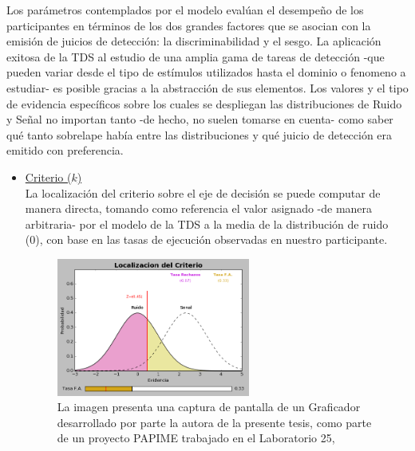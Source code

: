 Los parámetros contemplados por el modelo evalúan el desempeño de los participantes en términos de los dos grandes factores que se asocian con la emisión de juicios de detección: la discriminabilidad y el sesgo. La aplicación exitosa de la TDS al estudio de una amplia gama de tareas de detección -que pueden variar desde el tipo de estímulos utilizados hasta el dominio o fenomeno a estudiar- es posible gracias a la abstracción de sus elementos. Los valores y el tipo de evidencia específicos sobre los cuales se despliegan las distribuciones de Ruido y Señal no importan tanto -de hecho, no suelen tomarse en cuenta- como saber qué tanto sobrelape había entre las distribuciones y qué juicio de detección era emitido con preferencia.\\

\begin{itemize}
\item \underline{Criterio ($k$)}\\

La localización del criterio sobre el eje de decisión se puede computar de manera directa, tomando como referencia el valor asignado -de manera arbitraria- por el modelo de la TDS a la media de la distribución de ruido (0), con base en las tasas de ejecución observadas en nuestro participante. \\

\begin{figure}[th]
\centering
\includegraphics[width=0.60\textwidth]{Figures/Graficador_Criterio} 
\caption[Estimación del criterio con base en las Falsas Alarmas]{La imagen presenta una captura de pantalla de un Graficador desarrollado por parte la autora de la presente tesis, como parte de un proyecto PAPIME trabajado en el Laboratorio 25, \parencite{PAPIME}}
\label{fig:Graf_Criterio}
\end{figure}


\end{itemize}
